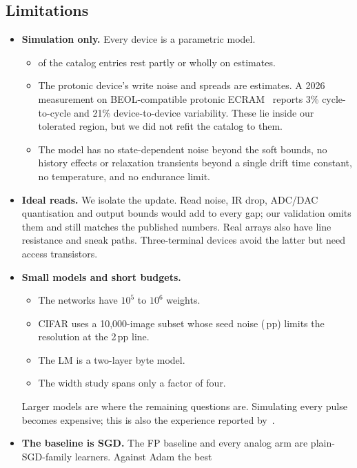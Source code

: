 \subsection{Limitations}\label{sec:limits}
\begin{itemize}
\item \textbf{Simulation only.} Every device is a parametric model.
      \begin{itemize}
      \item \RNCatalogEstimated{} of the \RNCatalog{} catalog entries rest partly or wholly on estimates.
      \item The protonic device's write noise and spreads are estimates. A 2026 measurement on BEOL-compatible protonic
            ECRAM~\cite{xu2026} reports 3\% cycle-to-cycle and 21\% device-to-device variability. These lie inside our tolerated
            region, but we did not refit the catalog to them.
      \item The model has no state-dependent noise beyond the soft bounds, no history effects or relaxation transients
            beyond a single drift time constant, no temperature, and no endurance limit.
      \end{itemize}
\item \textbf{Ideal reads.} We isolate the update. Read noise, IR drop, ADC/DAC quantisation and output bounds would add to
      every gap; our validation omits them and still matches the published numbers. Real arrays also have line resistance and
      sneak paths. Three-terminal devices avoid the latter but need access transistors.
\item \textbf{Small models and short budgets.}
      \begin{itemize}
      \item The networks have $10^5$ to $10^6$ weights.
      \item CIFAR uses a 10{,}000-image subset whose seed noise (\REThreeCifarFpSd\,pp) limits the resolution at the 2\,pp
            line.
      \item The LM is a two-layer byte model.
      \item The width study spans only a factor of four.
      \end{itemize}
      Larger models are where the remaining questions are. Simulating every pulse becomes expensive; this is also the
      experience reported by~\cite{rasch2024}.
\item \textbf{The baseline is SGD.} The FP baseline and every analog arm are plain-SGD-family learners. Against Adam the best

\end{itemize}
